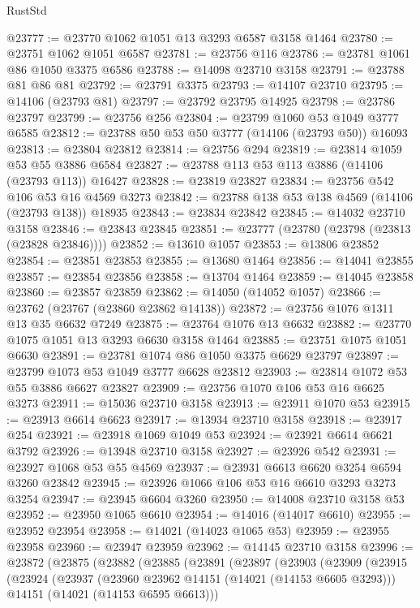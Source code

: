 \begin{lexlean}{RustStd}
\begin{coremodule}
@23777 := @23770 @1062 @1051 @13 @3293 @6587 @3158 @1464
@23780 := @23751 @1062 @1051 @6587
@23781 := @23756 @116
@23786 := @23781 @1061 @86 @1050 @3375 @6586
@23788 := @14098 @23710 @3158
@23791 := @23788 @81 @86 @81
@23792 := @23791 @3375
@23793 := @14107 @23710
@23795 := @14106 (@23793 @81)
@23797 := @23792 @23795 @14925
@23798 := @23786 @23797
@23799 := @23756 @256
@23804 := @23799 @1060 @53 @1049 @3777 @6585
@23812 := @23788 @50 @53 @50 @3777 (@14106 (@23793 @50)) @16093
@23813 := @23804 @23812
@23814 := @23756 @294
@23819 := @23814 @1059 @53 @55 @3886 @6584
@23827 := @23788 @113 @53 @113 @3886 (@14106 (@23793 @113)) @16427
@23828 := @23819 @23827
@23834 := @23756 @542 @106 @53 @16 @4569 @3273
@23842 := @23788 @138 @53 @138 @4569 (@14106 (@23793 @138)) @18935
@23843 := @23834 @23842
@23845 := @14032 @23710 @3158
@23846 := @23843 @23845
@23851 := @23777 (@23780 (@23798 (@23813 (@23828 @23846))))
@23852 := @13610 @1057
@23853 := @13806 @23852
@23854 := @23851 @23853
@23855 := @13680 @1464
@23856 := @14041 @23855
@23857 := @23854 @23856
@23858 := @13704 @1464
@23859 := @14045 @23858
@23860 := @23857 @23859
@23862 := @14050 (@14052 @1057)
@23866 := @23762 (@23767 (@23860 @23862 @14138))
@23872 := @23756 @1076 @1311 @13 @35 @6632 @7249
@23875 := @23764 @1076 @13 @6632
@23882 := @23770 @1075 @1051 @13 @3293 @6630 @3158 @1464
@23885 := @23751 @1075 @1051 @6630
@23891 := @23781 @1074 @86 @1050 @3375 @6629 @23797
@23897 := @23799 @1073 @53 @1049 @3777 @6628 @23812
@23903 := @23814 @1072 @53 @55 @3886 @6627 @23827
@23909 := @23756 @1070 @106 @53 @16 @6625 @3273
@23911 := @15036 @23710 @3158
@23913 := @23911 @1070 @53
@23915 := @23913 @6614 @6623
@23917 := @13934 @23710 @3158
@23918 := @23917 @254
@23921 := @23918 @1069 @1049 @53
@23924 := @23921 @6614 @6621 @3792
@23926 := @13948 @23710 @3158
@23927 := @23926 @542
@23931 := @23927 @1068 @53 @55 @4569
@23937 := @23931 @6613 @6620 @3254 @6594 @3260 @23842
@23945 := @23926 @1066 @106 @53 @16 @6610 @3293 @3273 @3254
@23947 := @23945 @6604 @3260
@23950 := @14008 @23710 @3158 @53
@23952 := @23950 @1065 @6610
@23954 := @14016 (@14017 @6610)
@23955 := @23952 @23954
@23958 := @14021 (@14023 @1065 @53)
@23959 := @23955 @23958
@23960 := @23947 @23959
@23962 := @14145 @23710 @3158
@23996 := @23872
    (@23875
      (@23882
        (@23885
          (@23891
            (@23897
              (@23903
                (@23909
                  (@23915
                    (@23924
                      (@23937
                        (@23960 @23962 @14151 (@14021 (@14153 @6605 @3293)))
                        @14151
                        (@14021 (@14153 @6595 @6613)))

\end{coremodule}
\end{lexlean}
